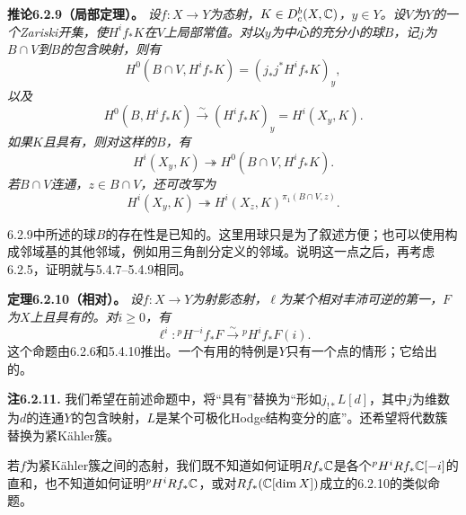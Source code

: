 \par\medskip\noindent\textbf{推论6.2.9（局部定理）。} \emph{设$f:X\to Y$为态射，$K\in D_c^b(X,\mathbb C)$，$y\in Y$。设$V$为$Y$的一个Zariski开集，使$H^if_*K$在$V$上局部常值。对以$y$为中心的充分小的球$B$，记$j$为$B\cap V$到$B$的包含映射，则有}
\[
H^0(B\cap V,H^if_*K)=(j_*j^*H^if_*K)_y,
\]
\emph{以及}
\[
H^0(B,H^if_*K)\xrightarrow{\sim}(H^if_*K)_y=H^i(X_y,K).
\]
\emph{如果$K$且具有，则对这样的$B$，有}
\begin{equation*}
H^i(X_y,K)\twoheadrightarrow H^0(B\cap V,H^if_*K).
\tag{6.2.9.1}
\end{equation*}
\emph{若$B\cap V$连通，$z\in B\cap V$，还可改写为}
\begin{equation*}
H^i(X_y,K)\twoheadrightarrow H^i(X_z,K)^{\pi_1(B\cap V,z)}.
\tag{6.2.9.2}
\end{equation*}

6.2.9中所述的球$B$的存在性是已知的。这里用球只是为了叙述方便；也可以使用构成邻域基的其他邻域，例如用三角剖分定义的邻域。说明这一点之后，再考虑6.2.5，证明就与5.4.7--5.4.9相同。

\par\medskip\noindent\textbf{定理6.2.10（相对）。} \emph{设$f:X\to Y$为射影态射，$\ell$为某个相对丰沛可逆的第一，$F$为$X$上且具有的。对$i\ge0$，有}
\[
\ell^i:{}^pH^{-i}f_*F\xrightarrow{\sim}{}^pH^if_*F(i).
\]
这个命题由6.2.6和5.4.10推出。一个有用的特例是$Y$只有一个点的情形；它给出的。

\par\medskip\noindent\textbf{注6.2.11.} 我们希望在前述命题中，将“具有”替换为“形如$j_{!*}L[d]$，其中$j$为维数为$d$的连通$Y$的包含映射，$L$是某个可极化Hodge结构变分的底”。还希望将代数簇替换为紧Kähler簇。

若$f$为紧Kähler簇之间的态射，我们既不知道如何证明$Rf_*\mathbb C$是各个${}^pH^iRf_*\mathbb C[-i]$的直和，也不知道如何证明${}^pH^iRf_*\mathbb C$，或对$Rf_*(\mathbb C[\dim X])$成立的6.2.10的类似命题。
